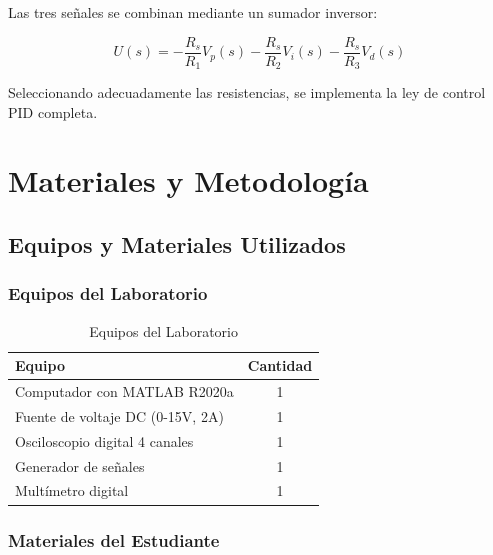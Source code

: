 \documentclass[conference]{IEEEtran}
\begin{document}
Las tres señales se combinan mediante un sumador inversor:

\begin{equation}
U(s) = -\frac{R_s}{R_1}V_p(s) - \frac{R_s}{R_2}V_i(s) - \frac{R_s}{R_3}V_d(s)
\label{eq:sumador}
\end{equation}

Seleccionando adecuadamente las resistencias, se implementa la ley de control PID completa.

\section{Materiales y Metodología}

\subsection{Equipos y Materiales Utilizados}

\subsubsection{Equipos del Laboratorio}

\begin{table}[htbp]
\centering
\caption{Equipos del Laboratorio}
\label{tab:equipos_lab}
\footnotesize
\begin{tabularx}{\columnwidth}{Xc}
\toprule
\textbf{Equipo} & \textbf{Cantidad} \\
\midrule
Computador con MATLAB R2020a & 1 \\
Fuente de voltaje DC (0-15V, 2A) & 1 \\
Osciloscopio digital 4 canales & 1 \\
Generador de señales & 1 \\
Multímetro digital & 1 \\
\bottomrule
\end{tabularx}
\end{table}

\subsubsection{Materiales del Estudiante}
\end{document}
